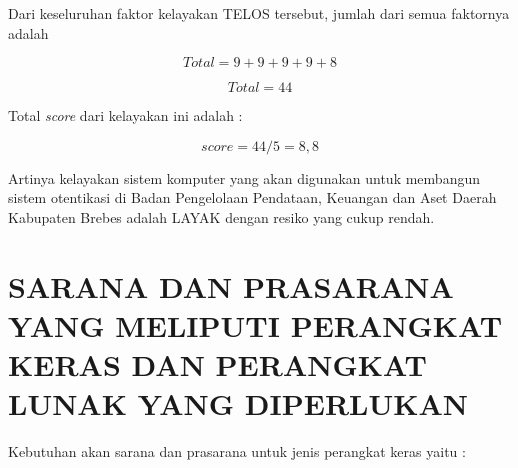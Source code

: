 \documentclass[pdftex,12pt, oneside]{article}
\begin{document}
Dari keseluruhan faktor kelayakan TELOS tersebut, jumlah dari semua faktornya adalah 

\[ Total = 9 + 9 + 9 + 9 + 8 \]

\[ Total = 44 \]

Total \textit{score} dari kelayakan ini adalah :

\[ score = 44 / 5 = 8,8 \]

Artinya kelayakan sistem komputer yang akan digunakan untuk membangun sistem otentikasi di Badan Pengelolaan Pendataan, Keuangan dan Aset Daerah Kabupaten Brebes adalah LAYAK dengan resiko yang cukup rendah.


\section{SARANA DAN PRASARANA YANG MELIPUTI PERANGKAT KERAS DAN PERANGKAT LUNAK YANG DIPERLUKAN}

Kebutuhan akan sarana dan prasarana untuk jenis perangkat keras yaitu :
\end{document}
